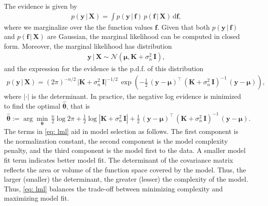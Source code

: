 \documentclass[journal=jacsat,manuscript=article, ]{achemso}
\newcommand{\xmatrix}{\ensuremath{\mathbf{X}}}
\begin{document}
 The evidence is given by
 \begin{gather*}
     p(\mathbf{y}\, | \, \xmatrix) = \int p(\mathbf{y}\, | \, \mathbf{f}) \,  p(\mathbf{f}\, | \, \xmatrix) \, \text{d}\mathbf{f},
 \end{gather*}
 where we marginalize over the the function values $\mathbf{f}$. Given that both $p(\mathbf{y}\, | \, \mathbf{f})$ and $ p(\mathbf{f}\, | \, \mathbf{X})$ are Gaussian, the marginal likelihood can be computed in closed form. Moreover, the marginal likelihood has distribution
 \begin{gather*}
     \mathbf{y}\, | \, \mathbf{X} \sim \mathcal{N}(\boldsymbol{\mu}, \mathbf{K} + \sigma_n^2 \,\mathbf{I}),
 \end{gather*}
 and the expression for the evidence is the p.d.f. of this distribution
 \begin{gather*}
     p(\mathbf{y}\, | \, \mathbf{X}) = (2\pi)^{-n/2}\,\vert \mathbf{K} + \sigma_n^2 \,\mathbf{I}\vert^{-1/2}\,\exp \left( -\frac{1}{2}\,(\mathbf{y}-\boldsymbol{\mu})^\intercal \, (\mathbf{K} + \sigma_n^2 \,\mathbf{I})^{-1}\,(\mathbf{y}-\boldsymbol{\mu})\right),
 \end{gather*}
 where $|\cdot|$ is the determinant. In practice, the negative log evidence is minimized to find the optimal $\hat{\boldsymbol{\theta}}$, that is
 \begin{gather}
     \hat{\boldsymbol{\theta}} := \arg \min_{\boldsymbol{\theta}} \, \frac{n}{2}\log{2\pi} + \frac{1}{2}\log{|\mathbf{K} + \sigma_n^2 \,\mathbf{I}|} +  \frac{1}{2}\,(\mathbf{y}-\boldsymbol{\mu})^\intercal \, (\mathbf{K} + \sigma_n^2 \,\mathbf{I})^{-1}\,(\mathbf{y}-\boldsymbol{\mu}). \label{eq: lml}
 \end{gather}
 The terms in \eqref{eq: lml} aid in model selection as follows. The first component is the normalization constant, the second component is the model complexity penalty, and the third component is the model first to the data. A smaller model fit term indicates better model fit. The determinant of the covariance matrix reflects the area or volume of the function space covered by the model. Thus, the larger (smaller) the determinant, the greater (lesser) the complexity of the model. Thus, \eqref{eq: lml} balances the trade-off between minimizing complexity and maximizing model fit.
\end{document}
